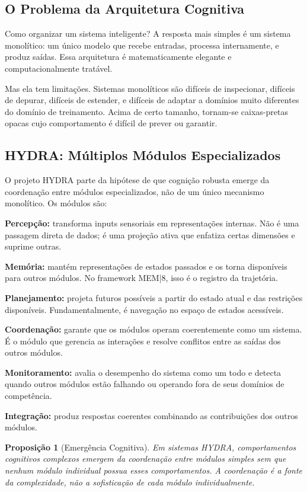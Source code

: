 \documentclass[11pt, a4paper]{article}
\theoremstyle{named}
\newtheorem{proposicao}{Proposição}
\begin{document}
\subsection{O Problema da Arquitetura Cognitiva}

Como organizar um sistema inteligente? A resposta mais simples é um
sistema monolítico: um único modelo que recebe entradas, processa
internamente, e produz saídas. Essa arquitetura é matematicamente
elegante e computacionalmente tratável.

Mas ela tem limitações. Sistemas monolíticos são difíceis de
inspecionar, difíceis de depurar, difíceis de estender, e difíceis
de adaptar a domínios muito diferentes do domínio de treinamento.
Acima de certo tamanho, tornam-se caixas-pretas opacas cujo
comportamento é difícil de prever ou garantir.

\subsection{HYDRA: Múltiplos Módulos Especializados}

O projeto HYDRA parte da hipótese de que cognição robusta emerge da
coordenação entre módulos especializados, não de um único mecanismo
monolítico. Os módulos são:

\textbf{Percepção:} transforma inputs sensoriais em representações
internas. Não é uma passagem direta de dados; é uma projeção ativa
que enfatiza certas dimensões e suprime outras.

\textbf{Memória:} mantém representações de estados passados e os torna
disponíveis para outros módulos. No framework MEM|8, isso é o registro
da trajetória.

\textbf{Planejamento:} projeta futuros possíveis a partir do estado
atual e das restrições disponíveis. Fundamentalmente, é navegação no
espaço de estados acessíveis.

\textbf{Coordenação:} garante que os módulos operam coerentemente
como um sistema. É o módulo que gerencia as interações e resolve
conflitos entre as saídas dos outros módulos.

\textbf{Monitoramento:} avalia o desempenho do sistema como um todo
e detecta quando outros módulos estão falhando ou operando fora de
seus domínios de competência.

\textbf{Integração:} produz respostas coerentes combinando as
contribuições dos outros módulos.

\begin{proposicao}[Emergência Cognitiva]
Em sistemas HYDRA, comportamentos cognitivos complexos emergem da
coordenação entre módulos simples sem que nenhum módulo individual
possua esses comportamentos. A coordenação é a fonte da complexidade,
não a sofisticação de cada módulo individualmente.
\end{proposicao}
\end{document}
